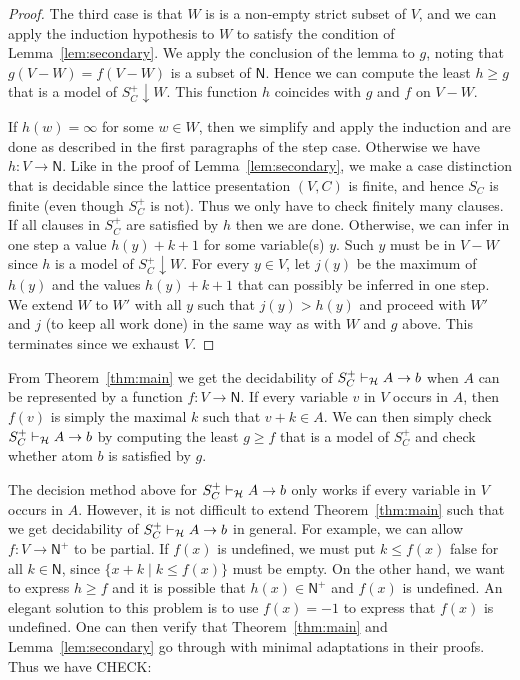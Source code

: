 \documentclass[11pt,a4paper]{article}
\newcommand{\N}{\mathsf{N}}
\newcommand\set[1]{\{#1\}}
\newcommand\prvH{\vdash_{\cal H}}
\newcommand\Ninf{\N^+}
\begin{document}
\begin{proof}
The third case is that $W$ is is a non-empty strict 
subset of $V$, and we can apply the induction
hypothesis to $W$ to satisfy the condition of 
Lemma~\ref{lem:secondary}. We apply the conclusion of 
the lemma to $g$, noting that $g(V-W)=f(V-W)$ is
a subset of $\N$. Hence we can compute the least 
$h\geq g$ that is a model of $S^+_C{\downarrow}W$.
This function $h$ coincides with $g$ and $f$ on $V-W$. 

If $h(w) = \infty$ for some $w\in W$, 
then we simplify and apply the induction and are done 
as described in the first paragraphs of the step case.
Otherwise we have $h: V\to\N$.
Like in the proof of Lemma~\ref{lem:secondary},
we make a case distinction that is decidable since
the lattice presentation $(V,C)$ is finite,
and hence $S_C$ is finite (even though $S^+_C$ is not).
Thus we only have to check finitely many clauses.
If all clauses in $S^+_C$ are satisfied by $h$ then we are done.
Otherwise, we can infer in one step a value $h(y)+k+1$ 
for some variable(s) $y$. Such $y$ must be in $V-W$ 
since $h$ is a model of $S^+_C{\downarrow}W$.
For every $y\in V$, let $j(y)$ be the maximum of $h(y)$
and the values $h(y)+k+1$ that can possibly
be inferred in one step.
We extend $W$ to $W'$ with all $y$ such that $j(y)>h(y)$ 
and proceed with $W'$ and $j$ (to keep all work done)
in the same way as with $W$ and $g$ above.
This terminates since we exhaust $V$.
\end{proof}


From Theorem~\ref{thm:main} we get the decidability of $S^+_C\prvH A\to b$
when $A$ can be represented by a function $f: V\to\N$. If every
variable $v$ in $V$ occurs in $A$, then $f(v)$ is simply
the maximal $k$ such that $v+k \in A$. We can then simply check
$S^+_C\prvH A\to b$ by computing the least $g\geq f$ that is
a model of $S^+_C$ and check whether atom $b$ is satisfied by $g$.

The decision method above for $S^+_C\prvH A\to b$ only works
if every variable in $V$ occurs in $A$.
However, it is not difficult to extend Theorem~\ref{thm:main}
such that we get decidability of $S^+_C\prvH A\to b$ in
general. For example, we can allow $f: V\to\Ninf$ to be partial.
If $f(x)$ is undefined, we must put $k\leq f(x)$ false
for all $k\in\N$, since $\set{x+k \mid k\leq f(x)}$ must be empty.
On the other hand, we want to express $h\geq f$ and it is possible 
that $h(x)\in\Ninf$ and $f(x)$ is undefined. 
An elegant solution to this
problem is to use $f(x)=-1$ to express that $f(x)$ is undefined.
One can then verify that Theorem~\ref{thm:main} and
Lemma~\ref{lem:secondary} go through with minimal adaptations
in their proofs. Thus we have {\color{red} CHECK}:
\end{document}
